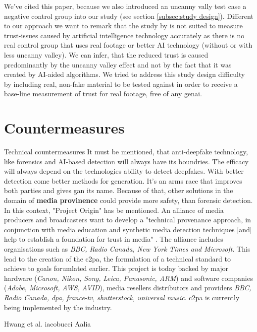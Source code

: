 \documentclass[
  a4paper,  %
  twoside,  %
  bibliography=totoc,
  headsepline,
  cleardoublepage=empty,
  parskip=half,
  draft=false
]{scrbook}
\begin{document}
We've cited this paper, because we also introduced an uncanny vally test case a negative control group into our study (see section \ref{subsec:study design}). Different to our approach we want to remark that the study by  is not suited to measure trust-issues caused by artificial intelligence technology accurately as there is no real control group that uses real footage or better AI technology (without or with less uncanny valley). We can infer, that the reduced trust is caused predominantly by the uncanny valley effect and not by the fact that it was created by AI-aided algorithms. We tried to address this study design difficulty by including real, non-fake material to be tested against in order to receive a base-line measurement of trust for real footage, free of any \gls{genai}.



\section{Countermeasures}
\label{sec:rel-work-counteringdf}
Technical countermeasures
It must be mentioned, that anti-deepfake technology, like forensics and AI-based detection will always have its boundries. The efficacy will always depend on the technologies ability to detect deepfakes. With better detection come better methods for generation. It's an arms race that improves both parties and gives \gls{gan} its name. Because of that, other solutions in the domain of \textbf{media provinence} could provide more safety, than forensic detection. In this context, "Project Origin" has be mentioned. An alliance of media producers and broadcasters want to develop a "technical provenance approach, in conjunction with media education and synthetic media detection techniques [and] help to establish a foundation for trust in media" \cite{ProjectOrigin}. The alliance includes organisations such as \textit{BBC, Radio Canada, New York Times and Microsoft}. This lead to the creation of the \gls{c2pa}, the formulation of a technical standard to achieve to goals forumlated earlier. This project is today backed by major hardware (\textit{Canon, Nikon, Sony, Leica, Panasonic, ARM}) and software companies (\textit{Adobe, Microsoft, AWS, AVID}), media resellers distributors and providers \textit{BBC, Radio Canada, dpa, france-tv, shutterstock, universal music}. \gls{c2pa} is currently being implemented by the industry.


 Hwang et al.
 iacobucci
 Aalia
\end{document}
